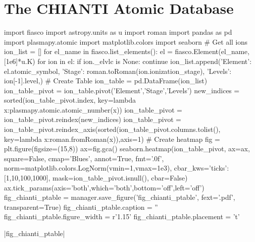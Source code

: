 \documentclass[12pt,aspectratio=169]{beamer}
\begin{document}
\section{The CHIANTI Atomic Database}
\begin{frame}[fragile]
    \begin{pycode}[manager]
import fiasco
import astropy.units as u
import roman
import pandas as pd
import plasmapy.atomic
import matplotlib.colors
import seaborn
# Get all ions
ion_list = []
for el_name in fiasco.list_elements():
    el = fiasco.Element(el_name,[1e6]*u.K)
    for ion in el:
        if ion._elvlc is None:
            continue
        ion_list.append({'Element': el.atomic_symbol,
                         'Stage': roman.toRoman(ion.ionization_stage),
                         'Levels': ion[-1].level,})
# Create Table
ion_table = pd.DataFrame(ion_list)
ion_table_pivot = ion_table.pivot('Element','Stage','Levels')
new_indices = sorted(ion_table_pivot.index, key=lambda x:plasmapy.atomic.atomic_number(x))
ion_table_pivot = ion_table_pivot.reindex(new_indices)
ion_table_pivot = ion_table_pivot.reindex_axis(sorted(ion_table_pivot.columns.tolist(),
                                                      key=lambda x:roman.fromRoman(x)),axis=1)
# Create heatmap
fig = plt.figure(figsize=(15,8))
ax=fig.gca()
seaborn.heatmap(ion_table_pivot,
                ax=ax,
                square=False,
                cmap='Blues',
                annot=True,
                fmt='.0f',
                norm=matplotlib.colors.LogNorm(vmin=1,vmax=1e3),
                cbar_kws={'ticks':[1,10,100,1000]},
                mask=ion_table_pivot.isnull(),
                cbar=False)
ax.tick_params(axis='both',which='both',bottom='off',left='off')
fig_chianti_ptable = manager.save_figure('fig_chianti_ptable', fext='.pdf', transparent=True)
fig_chianti_ptable.caption = ''
fig_chianti_ptable.figure_width = r'1.15\textwidth'
fig_chianti_ptable.placement = 't'
    \end{pycode}
    \vspace{-5ex}
    \py[manager]|fig_chianti_ptable|
\end{frame}
\end{document}
